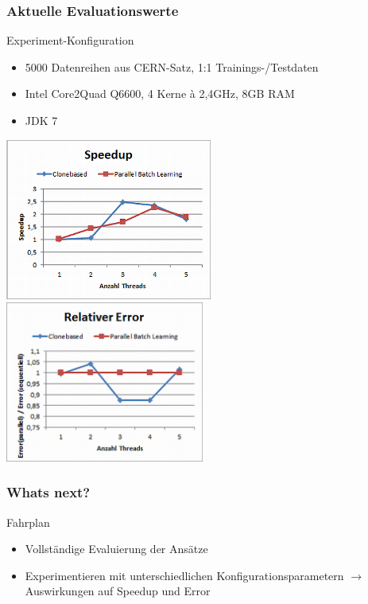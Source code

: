 \documentclass[18pt]{beamer}
\begin{document}
	\begin{frame}[c]\frametitle{Aktuelle Evaluationswerte}
		\begin{block}{Experiment-Konfiguration}
			\begin{itemize}
				\item 5000 Datenreihen aus CERN-Satz, 1:1 Trainings-/Testdaten
				\item Intel Core2Quad Q6600, 4 Kerne à 2,4GHz, 8GB RAM
				\item JDK 7
			\end{itemize}
		\end{block}
		\includegraphics[width=0.51\textwidth]{images/eval_speedup.png}
		\includegraphics[width=0.49\textwidth]{images/eval_error.png}
	\end{frame}

	\begin{frame}[c]\frametitle{Whats next?}
		\begin{block}{Fahrplan}
		    \begin{itemize}
		    	\item Vollständige Evaluierung der Ansätze
		    	\item Experimentieren mit unterschiedlichen Konfigurationsparametern $\rightarrow$ Auswirkungen auf Speedup und Error
		    \end{itemize}
		\end{block}
	\end{frame}
\end{document}
